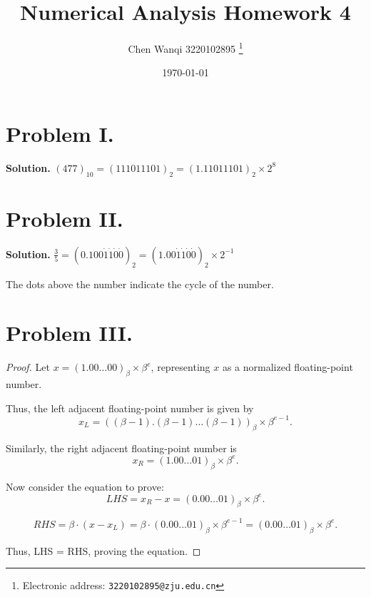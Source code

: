 \documentclass[a4paper]{article}
\begin{document}
\title{Numerical Analysis Homework 4}

\author{Chen Wanqi 3220102895
  \thanks{Electronic address: \texttt{3220102895@zju.edu.cn}}}


\date{\today}

\maketitle

\section*{Problem I.}

\textbf{Solution.}
\((477)_{10} = (111011101)_2 = (1.11011101)_2 \times 2^8\)


\section*{Problem II.}

\textbf{Solution.}
\(\frac{3}{5} = (0.100\dot{1}\dot{1}\dot{0}\dot{0})_2 = (1.00\dot{1}\dot{1}\dot{0}\dot{0})_2 \times 2^{-1} \)


The dots above the number indicate the cycle of the number.

\section*{Problem III.}

\begin{proof}
    Let \(x = (1.00\ldots00)_{\beta} \times \beta^e\), representing \(x\) as a normalized floating-point number.
    
    Thus, the left adjacent floating-point number is given by 
    \[
    x_L = ((\beta-1).(\beta-1)\ldots(\beta-1))_{\beta} \times \beta^{e-1}.
    \]
    
    Similarly, the right adjacent floating-point number is 
    \[
    x_R = (1.00\ldots01)_{\beta} \times \beta^e.
    \]
    
    Now consider the equation to prove:
    \[
    LHS = x_R - x = (0.00\ldots01)_{\beta} \times \beta^e .
    \]
    
    \[
    RHS = \beta \cdot (x - x_L) = \beta \cdot (0.00\ldots01)_{\beta} \times \beta^{e-1} = (0.00\ldots01)_{\beta} \times \beta^e.
    \]

    Thus, LHS = RHS, proving the equation.
\end{proof}
\end{document}
